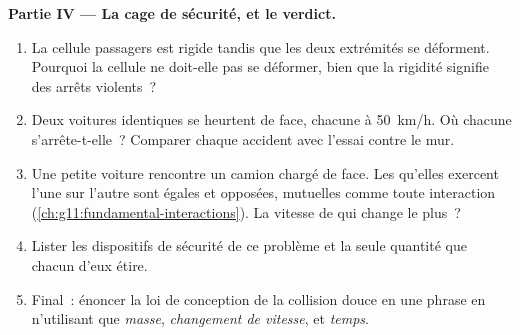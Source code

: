 \begin{problem}
\medskip
\noindent\textbf{Partie IV --- La cage de sécurité, et le verdict.}
\begin{enumerate}[resume]
  \item La cellule passagers est rigide tandis que les deux extrémités
        se déforment. Pourquoi la cellule ne doit-elle pas se déformer,
        bien que la rigidité signifie des arrêts violents~?
  \item Deux voitures identiques se heurtent de face, chacune à
        \qty{50}{km/h}. Où chacune s'arrête-t-elle~? Comparer chaque
        accident avec l'essai contre le mur.
  \item Une petite voiture rencontre un camion chargé de face. Les
         qu'elles exercent l'une sur
        l'autre sont égales et opposées, mutuelles comme toute
        interaction (\cref{ch:g11:fundamental-interactions}). La vitesse
        de qui change le plus~?
  \item Lister les dispositifs de sécurité de ce problème et la seule
        quantité que chacun d'eux étire.
  \item Final~: énoncer la loi de conception de la collision douce en
        une phrase en n'utilisant que \emph{masse}, \emph{changement de
        vitesse}, \emph{} et
        \emph{temps}.
\end{enumerate}
\end{problem}
